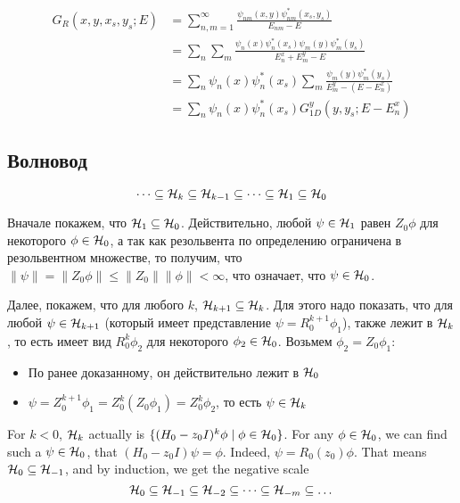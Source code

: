 \begin{align*}
G_R(x, y, x_s, y_s; E)
&= \sum\limits_{n, m = 1}^\infty \frac{\psi_{nm}(x, y) \psi^*_{nm}(x_s, y_s)}{E_{nm} - E} \\
&= \sum\limits_n \sum\limits_m \frac{\psi_n(x) \psi_n^*(x_s) \psi_m(y) \psi_m^*(y_s)}{E^x_n + E^y_m - E} \\
&= \sum\limits_n \psi_n(x) \psi_n^*(x_s) \sum\limits_m \frac{\psi_m(y) \psi_m^*(y_s)}{E^y_m - (E - E^x_n)} \\
&= \sum\limits_n \psi_n(x) \psi^*_n(x_s) G^y_{1D}(y, y_s; E - E^x_n)
\end{align*}

\subsection{Волновод}


\begin{prop}
\[
\dots \subseteq \mathcal{H}_{k} \subseteq \mathcal{H}_{k - 1} \subseteq \dots \subseteq \mathcal{H}_{1} \subseteq{\mathcal{H}_{0}}
\]
\end{prop}
Вначале покажем, что $\mathcal{H}_{1} \subseteq \mathcal{H}_{0}$. Действительно, любой $\psi \in \mathcal{H}_{1}$ равен $Z_0 \phi$ для некоторого $\phi \in \mathcal{H}_{0}$, а так как резольвента по определению ограничена в резольвентном множестве, то получим, что $\| \psi \| = \| Z_0 \phi \| \le \|Z_0\| \|\phi\| < \infty$, что означает, что $\psi \in \mathcal{H}_{0}$.

Далее, покажем, что для любого $k$, $\mathcal{H}_{k + 1} \subseteq \mathcal{H}_{k}$. Для этого надо показать, что для любой $\psi \in \mathcal{H}_{k + 1}$ (который имеет представление $\psi = R_0^{k + 1} \phi_1$), также лежит в $\mathcal{H}_{k}$, то есть имеет вид $R_0^k \phi_2$ для некоторого $\phi_2 \in \mathcal{H}_{0}$. Возьмем $\phi_2 = Z_0 \phi_1$:
\begin{itemize}
\item По ранее доказанному, он действительно лежит в $\mathcal{H}_{0}$
\item $\psi = Z_0^{k + 1} \phi_1 = Z_0^k (Z_0 \phi_1) = Z_0^k \phi_2$, то есть $\psi \in \mathcal{H}_{k}$
\end{itemize}



For $k < 0$, $\mathcal{H}_{k}$ actually is $\{ (H_0 - z_0 I)^k \phi \mid \phi \in \mathcal{H}_{0} \}$.
For any $\phi \in \mathcal{H}_{0}$, we can find such a $\psi \in \mathcal{H}_{0}$, that $(H_0 - z_0 I) \psi = \phi$. Indeed, $\psi = R_0(z_0) \phi$. That means $\mathcal{H}_{0} \subseteq \mathcal{H}_{-1}$, and by induction, we get the negative scale
\[
\mathcal{H}_{0} \subseteq \mathcal{H}_{-1} \subseteq \mathcal{H}_{-2} \subseteq \dots \subseteq \mathcal{H}_{-m} \subseteq \dots
\] 



